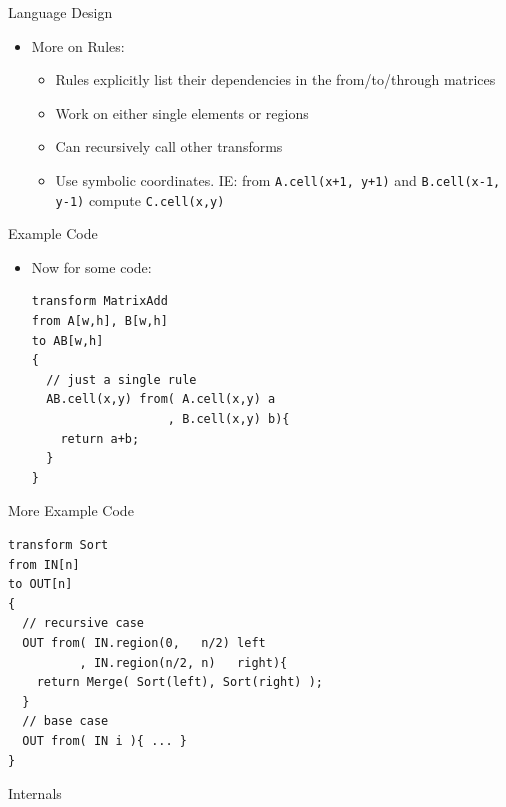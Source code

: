 \documentclass[pdf,blends]{prosper}
\begin{document}
\begin{slide}{Language Design}
  \begin{itemize}
  \item More on Rules:
    \begin{itemize}
    \item Rules explicitly list their dependencies in the from/to/through matrices 
    \item Work on either single elements or regions
    \item Can recursively call other transforms
    \item Use symbolic coordinates.
    { \small IE: from {\tt A.cell(x+1, y+1)} and {\tt B.cell(x-1, y-1)} compute {\tt C.cell(x,y)}}
    \end{itemize}
  \end{itemize}
\end{slide}



\begin{slide}{Example Code}
\begin{itemize}
\item Now for some code:
{\small
\begin{verbatim}
transform MatrixAdd
from A[w,h], B[w,h] 
to AB[w,h]
{
  // just a single rule
  AB.cell(x,y) from( A.cell(x,y) a
                   , B.cell(x,y) b){
    return a+b;
  }
}
\end{verbatim}}
\end{itemize}
\end{slide}

\begin{slide}{More Example Code}
{\footnotesize
\begin{verbatim}
transform Sort 
from IN[n]
to OUT[n]
{
  // recursive case
  OUT from( IN.region(0,   n/2) left
          , IN.region(n/2, n)   right){
    return Merge( Sort(left), Sort(right) );
  }
  // base case
  OUT from( IN i ){ ... }
}
\end{verbatim}}
\end{slide}


\begin{slide}{Internals}
\vspace{.5cm}
\begin{center}
\end{center}
\end{slide}
\end{document}
